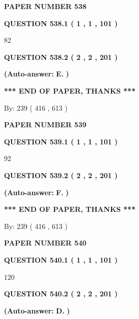 \documentclass{ctexart}
\begin{document}
   
 {\textbf{ \Large{ PAPER NUMBER  538  }}}
   
   
   
   
  
  
{\textbf{\large{QUESTION
538.1 
 ( 1 , 1 , 101 )
}}}

82
  
  
{\textbf{\large{QUESTION
538.2 
 ( 2 , 2 , 201 )
}}}
 
 
{\textbf{(Auto-answer:}}
{\textbf{\large{
E.}}}
{\textbf{)}}
 
 
   
   
   
   
\vspace{1.0in} 
{\textbf{\large{ *** END OF PAPER, THANKS *** }}} 
   
   
\hspace{1.0in} By: 
 239 ( 416 ,  613 )
   
   
   
   
\newpage 
\setcounter{page}{ 
   539001 } 
   
   
 {\textbf{ \Large{ PAPER NUMBER  539  }}}
   
   
   
   
  
  
{\textbf{\large{QUESTION
539.1 
 ( 1 , 1 , 101 )
}}}

92
  
  
{\textbf{\large{QUESTION
539.2 
 ( 2 , 2 , 201 )
}}}
 
 
{\textbf{(Auto-answer:}}
{\textbf{\large{
F.}}}
{\textbf{)}}
 
 
   
   
   
   
\vspace{1.0in} 
{\textbf{\large{ *** END OF PAPER, THANKS *** }}} 
   
   
\hspace{1.0in} By: 
 239 ( 416 ,  613 )
   
   
   
   
\newpage 
\setcounter{page}{ 
   540001 } 
   
   
 {\textbf{ \Large{ PAPER NUMBER  540  }}}
   
   
   
   
  
  
{\textbf{\large{QUESTION
540.1 
 ( 1 , 1 , 101 )
}}}

120
  
  
{\textbf{\large{QUESTION
540.2 
 ( 2 , 2 , 201 )
}}}
 
 
{\textbf{(Auto-answer:}}
{\textbf{\large{
D.}}}
{\textbf{)}}
 
\end{document}

